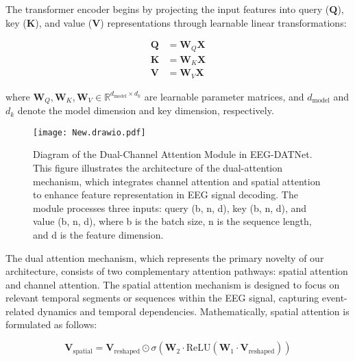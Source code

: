 \documentclass[pdflatex,sn-mathphys-num]{sn-jnl}%
\theoremstyle{thmstyleone}%
\theoremstyle{thmstyletwo}%
\theoremstyle{thmstylethree}%
\begin{document}
The transformer encoder begins by projecting the input features into query ($\mathbf{Q}$), key ($\mathbf{K}$), and value ($\mathbf{V}$) representations through learnable linear transformations:



\begin{equation}
\begin{aligned}
\mathbf{Q} &= \mathbf{W}_Q\mathbf{X} \\
\mathbf{K} &= \mathbf{W}_K\mathbf{X} \\
\mathbf{V} &= \mathbf{W}_V\mathbf{X}
\end{aligned}
\end{equation}

where $\mathbf{W}_Q, \mathbf{W}_K, \mathbf{W}_V \in \mathbb{R}^{d_{\text{model}} \times d_k}$ are learnable parameter matrices, and $d_{\text{model}}$ and $d_k$ denote the model dimension and key dimension, respectively.

\begin{figure*}[h]
    \centering
    \texttt{[image: New.drawio.pdf]}
    \caption{Diagram of the Dual-Channel Attention Module in EEG-DATNet. This figure illustrates the architecture of the dual-attention mechanism, which integrates channel attention and spatial attention to enhance feature representation in EEG signal decoding. The module processes three inputs: query (b, n, d), key (b, n, d), and value (b, n, d), where b is the batch size, n is the sequence length, and d is the feature dimension.}
    \label{fig:Dual_Attention_Module}
\end{figure*}

The dual attention mechanism, which represents the primary novelty of our architecture, consists of two complementary attention pathways: spatial attention and channel attention. The spatial attention mechanism is designed to focus on relevant temporal segments or sequences within the EEG signal, capturing event-related dynamics and temporal dependencies. Mathematically, spatial attention is formulated as follows:

\begin{equation}
\mathbf{V}_{\text{spatial}} = \mathbf{V}_{\text{reshaped}} \odot \sigma\left(\mathbf{W}_2 \cdot \text{ReLU}(\mathbf{W}_1 \cdot \mathbf{V}_{\text{reshaped}})\right)
\end{equation}
\end{document}
